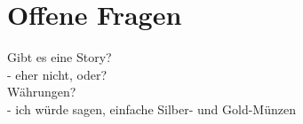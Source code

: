 \section{Offene Fragen}
\label{sec:offene_fragen}

Gibt es eine Story?\\
- eher nicht, oder?\\
Währungen?\\
- ich würde sagen, einfache Silber- und Gold-Münzen

\newpage